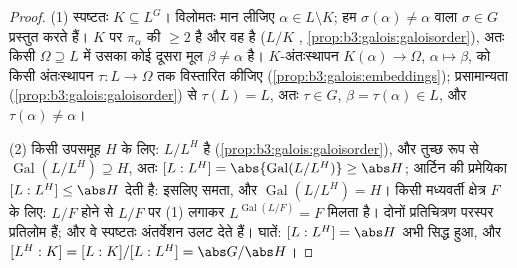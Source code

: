 \begin{proof}
(1) स्पष्टतः $K \subseteq L^G$। विलोमतः मान लीजिए $\alpha \in L
\setminus K$; हम $\sigma(\alpha) \ne
\alpha$ वाला
$\sigma \in G$ प्रस्तुत करते हैं। $K$ पर  $\pi_\alpha$ की 
$\geq 2$ है और वह  है ($L/K$ , \cref{prop:b3:galois:galoisorder}), अतः किसी
 $\Omega \supseteq L$ में उसका कोई दूसरा मूल $\beta \neq \alpha$ है।
$K$-अंतःस्थापन $K(\alpha) \to \Omega$, $\alpha \mapsto
\beta$, को किसी अंतःस्थापन $\tau\colon L \to \Omega$ तक
विस्तारित कीजिए (\cref{prop:b3:galois:embeddings}); प्रसामान्यता (\cref{prop:b3:galois:galoisorder}) से $\tau(L) = L$, अतः
$\tau \in
G$, $\beta = \tau(\alpha) \in L$, और $\tau(\alpha) \neq
\alpha$।

(2) किसी उपसमूह $H$ के लिए: $L/L^H$  है (\cref{prop:b3:galois:galoisorder}), और तुच्छ
रूप से $\operatorname{Gal}(L/L^H) \supseteq H$, अतः $[L:L^H] =
\abs{\operatorname{Gal}(L/L^H)} \geq \abs H$; आर्टिन की प्रमेयिका $[L:L^H] \leq \abs H$ देती है:
इसलिए समता, और $\operatorname{Gal}(L/L^H) = H$। किसी मध्यवर्ती क्षेत्र $F$ के लिए:
$L/F$  होने से $L/F$ पर (1) लगाकर $L^{\operatorname{Gal}(L/F)} = F$ मिलता है। दोनों
प्रतिचित्रण परस्पर प्रतिलोम हैं; और वे स्पष्टतः अंतर्वेशन उलट
देते हैं। घातें: $[L:L^H] = \abs H$ अभी सिद्ध हुआ, और $[L^H:K] = [L:K]/[L:L^H] = \abs G/\abs H$।


\end{proof}
